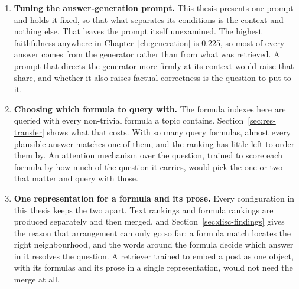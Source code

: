 \begin{enumerate}[leftmargin=1.7em,itemsep=0.7em,topsep=0.5em]

\item \textbf{Tuning the answer-generation prompt.} This thesis presents one prompt and holds it
fixed, so that what separates its conditions is the context and nothing else. That leaves the prompt
itself unexamined. The highest faithfulness anywhere in Chapter~\ref{ch:generation} is 0.225, so most
of every answer comes from the generator rather than from what was retrieved. A prompt that directs
the generator more firmly at its context would raise that share, and whether it also raises factual
correctness is the question to put to it.

\item \textbf{Choosing which formula to query with.} The formula indexes here are queried with every
non-trivial formula a topic contains. Section~\ref{sec:res-transfer} shows what that costs. With so
many query formulas, almost every plausible answer matches one of them, and the ranking has little
left to order them by. An attention mechanism over the question, trained to score each formula by how
much of the question it carries, would pick the one or two that matter and query with those.

\item \textbf{One representation for a formula and its prose.} Every configuration in this thesis
keeps the two apart. Text rankings and formula rankings are produced separately and then merged, and
Section~\ref{sec:disc-findings} gives the reason that arrangement can only go so far: a formula match
locates the right neighbourhood, and the words around the formula decide which answer in it resolves
the question. A retriever trained to embed a post as one object, with its formulas and its prose in a
single representation, would not need the merge at all.

\end{enumerate}
